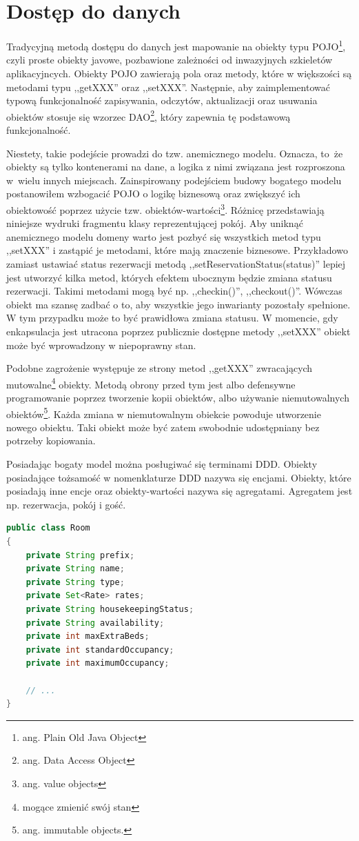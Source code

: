 \documentclass[a4paper,onecolumn,oneside,11pt,wide,floatssmall]{mwrep}
\theoremstyle{definition}
\theoremstyle{plain}%
\theoremstyle{remark}
\begin{document}
\section{Dostęp do danych}
Tradycyjną metodą dostępu do danych jest mapowanie na obiekty typu POJO\footnote{ang. Plain Old Java Object}, czyli proste obiekty javowe, pozbawione zależności od inwazyjnych szkieletów aplikacyjncych. Obiekty POJO zawierają pola oraz metody, które w większości są metodami typu ,,getXXX'' oraz ,,setXXX''. Następnie, aby zaimplementować typową funkcjonalność zapisywania, odczytów, aktualizacji oraz usuwania obiektów stosuje się wzorzec DAO\footnote{ang. Data Access Object}, który zapewnia tę podstawową funkcjonalność.

Niestety, takie podejście prowadzi do tzw. anemicznego modelu. Oznacza, \mbox{to że} obiekty są tylko kontenerami na dane, a logika z nimi związana jest rozproszona \mbox{w wielu} innych miejscach. Zainspirowany podejściem budowy bogatego modelu \cite{evans2004domain} postanowiłem wzbogacić POJO o logikę biznesową oraz zwiększyć ich obiektowość poprzez użycie tzw. obiektów-wartości\footnote{ang. value objects}. Różnicę przedstawiają niniejsze wydruki fragmentu klasy reprezentującej pokój. Aby uniknąć anemicznego modelu domeny warto jest pozbyć się wszystkich metod typu ,,setXXX'' i zastąpić je metodami, które mają znaczenie biznesowe. Przykładowo zamiast ustawiać status rezerwacji metodą ,,setReservationStatus(status)'' lepiej jest utworzyć kilka metod, których efektem ubocznym będzie zmiana statusu rezerwacji. Takimi metodami mogą być np. ,,checkin()'', ,,checkout()''. Wówczas obiekt ma szansę zadbać o to, aby wszystkie jego inwarianty pozostały spełnione. W tym przypadku może to być prawidłowa zmiana statusu. W momencie, gdy enkapsulacja jest utracona poprzez publicznie dostępne metody ,,setXXX'' obiekt może być wprowadzony w niepoprawny stan.

Podobne zagrożenie występuje ze strony metod ,,getXXX'' zwracających mutowalne\footnote{mogące zmienić swój stan} obiekty. Metodą obrony przed tym jest albo defensywne programowanie poprzez tworzenie kopii obiektów, albo używanie niemutowalnych obiektów\footnote{ang. immutable objects.}. Każda zmiana w niemutowalnym obiekcie powoduje utworzenie nowego obiektu. Taki obiekt może być zatem swobodnie udostępniany bez potrzeby kopiowania.

Posiadając bogaty model można posługiwać się terminami DDD. Obiekty posiadające tożsamość w nomenklaturze DDD nazywa się encjami. Obiekty, które posiadają inne encje oraz obiekty-wartości nazywa się agregatami. Agregatem jest np. rezerwacja, pokój i gość.
\clearpage
\begin{lstlisting}[language=Java,style=outcode,caption=anemiczne POJO]
public class Room
{
    private String prefix; 
    private String name;
    private String type;
    private Set<Rate> rates;
    private String housekeepingStatus;
    private String availability;
    private int maxExtraBeds;
    private int standardOccupancy;
    private int maximumOccupancy;

    // ...
}
\end{lstlisting}
\end{document}
